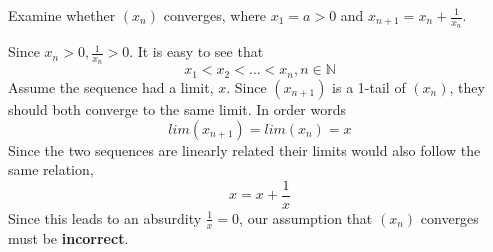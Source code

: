 \documentclass[boxes, qed]{homework}
\begin{document}
\newenvironment{amatrix}[1]{%
  \left[\begin{array}{@{}*{#1}{c}|c@{}}
}{%
  \end{array}\right]
}

\newenvironment{augmatrix}[1]{%
  \left[\begin{array}{#1}
}{%
  \end{array}\right]
}

\begin{problem}Examine whether $(x_n)$ converges, where
  $x_1=a>0$ and $x_{n+1}=x_n+\frac{1}{x_n}$.
\end{problem}
\begin{solution}Since $x_n>0, \frac{1}{x_n}>0$. It is easy to see that
  $$x_1<x_2<\dots<x_n, n\in{\mathbb{N}}$$
  Assume the sequence had a limit, $x$. Since $(x_{n+1})$ is a 1-tail
  of $(x_n)$, they should both converge to the same limit. In order words
  $$lim(x_{n+1})=lim(x_n)=x$$
  Since the two sequences are linearly related
  their limits would also follow the same relation,
  $$x=x+\frac{1}{x}$$
  Since this leads to an absurdity $\frac{1}{x}=0$,
  our assumption that $(x_n)$ converges must be \textbf{incorrect}.
\end{solution}
\end{document}
